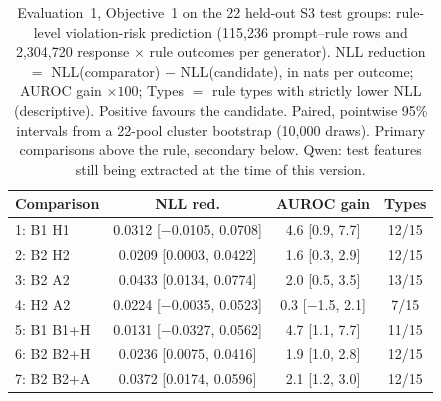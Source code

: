 \begin{table}[t]
\centering\footnotesize
\caption{Evaluation~1, Objective~1 on the 22 held-out S3 test groups: rule-level violation-risk prediction (115,236 prompt--rule rows and 2,304,720 response $\times$ rule outcomes per generator). NLL reduction $=$ NLL(comparator) $-$ NLL(candidate), in nats per outcome; AUROC gain $\times100$; Types $=$ rule types with strictly lower NLL (descriptive). Positive favours the candidate. Paired, pointwise 95\% intervals from a 22-pool cluster bootstrap (10,000 draws). Primary comparisons above the rule, secondary below. Qwen: test features still being extracted at the time of this version.}
\label{tab:e1o1}
\begin{tabular}{lccc}
\toprule
Comparison & NLL red. & AUROC gain & Types \\
\midrule
1: B1 \cto{} H1 & 0.0312 [$-$0.0105, 0.0708] & 4.6 [0.9, 7.7] & 12/15 \\
2: B2 \cto{} H2 & 0.0209 [0.0003, 0.0422] & 1.6 [0.3, 2.9] & 12/15 \\
3: B2 \cto{} A2 & 0.0433 [0.0134, 0.0774] & 2.0 [0.5, 3.5] & 13/15 \\
4: H2 \cto{} A2 & 0.0224 [$-$0.0035, 0.0523] & 0.3 [$-$1.5, 2.1] & 7/15 \\
\midrule
5: B1 \cto{} B1+H & 0.0131 [$-$0.0327, 0.0562] & 4.7 [1.1, 7.7] & 11/15 \\
6: B2 \cto{} B2+H & 0.0236 [0.0075, 0.0416] & 1.9 [1.0, 2.8] & 12/15 \\
7: B2 \cto{} B2+A & 0.0372 [0.0174, 0.0596] & 2.1 [1.2, 3.0] & 12/15 \\
\bottomrule
\end{tabular}
\end{table}

